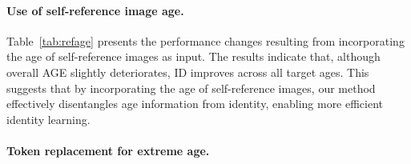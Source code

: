 \paragraph{
Use of self-reference image age.}
\begin{table*}[t]
  \centering
  \caption{
    Quantitative comparison of our method with and without using self-reference image age. 
    }
  \label{tab:refage}
\end{table*}

Table~\ref{tab:refage} presents the performance changes resulting from incorporating the age of self-reference images as input.
The results indicate that, although overall AGE slightly deteriorates, ID improves across all target ages.
This suggests that by incorporating the age of self-reference images, our method effectively disentangles age information from identity, enabling more efficient identity learning.

\paragraph{
Token replacement for extreme age. 
}
\label{sec:eval_baby}


